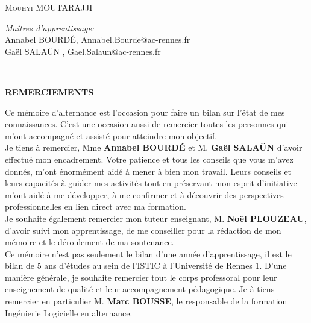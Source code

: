 \documentclass[12pt]{article}
\begin{document}
\begin{titlepage}
	\centering   %
	\textsc{ Mouhyi MOUTARAJJI}\\
		\begin{flushleft} \large
		    \emph{Maîtres d'apprentissage:} \\
		    Annabel BOURDÉ, Annabel.Bourde@ac-rennes.fr\\
			Gaël SALAÜN , Gael.Salaun@ac-rennes.fr\\
			
			
		\end{flushleft}
	
\end{titlepage}


\newpage

\tableofcontents

\newpage

\listoffigures
~
\newpage
\begin{center}
\bfseries {REMERCIEMENTS}
\end{center}


Ce mémoire d'alternance est l'occasion pour faire un bilan sur l'état de mes connaissances. C'est une occasion aussi de remercier toutes les personnes qui m'ont accompagné et assisté pour atteindre mon objectif.\\


Je tiens à remercier, Mme \textbf{Annabel BOURDÉ} et M. \textbf{Gaël SALAÜN} d'avoir effectué mon encadrement. Votre patience et tous les conseils que vous m'avez donnés, m'ont énormément aidé à mener à bien mon travail. Leurs conseils et leurs capacités à guider mes activités tout en préservant mon esprit d'initiative m'ont aidé à me développer, à me confirmer et à découvrir des perspectives professionnelles en lien direct avec ma formation.\\ 


Je souhaite également remercier mon tuteur enseignant, M. \textbf{Noël PLOUZEAU},  d'avoir suivi mon apprentissage, de me conseiller pour la rédaction de mon mémoire et le déroulement de ma soutenance. \\

Ce mémoire n'est pas seulement le bilan d'une année d'apprentissage, il est le bilan de 5 ans d'études au sein de l'ISTIC à l'Université de Rennes 1. D'une manière générale, je souhaite remercier tout le corps professoral pour leur enseignement de qualité et leur accompagnement pédagogique. Je à tiens remercier en particulier M. \textbf{Marc BOUSSE}, le responsable de la formation Ingénierie Logicielle en alternance. \\
\end{document}
